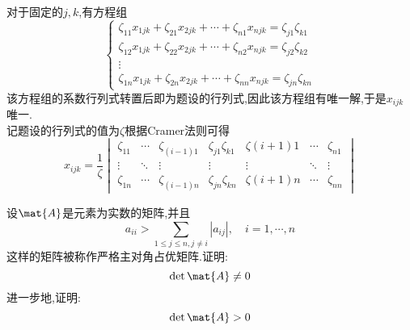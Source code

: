 \documentclass{ctexart}
\begin{document}
\begin{solution}
    对于固定的$j,k$,有方程组
    \[\left\{\begin{array}{c}
        \zeta_{11}x_{1jk}+\zeta_{21}x_{2jk}+\cdots+\zeta_{n1}x_{njk}=\zeta_{j1}\zeta_{k1}\\
        \zeta_{12}x_{1jk}+\zeta_{22}x_{2jk}+\cdots+\zeta_{n2}x_{njk}=\zeta_{j2}\zeta_{k2}\\
        \vdots\\
        \zeta_{1n}x_{1jk}+\zeta_{2n}x_{2jk}+\cdots+\zeta_{nn}x_{njk}=\zeta_{jn}\zeta_{kn}
    \end{array}\right.\]
    该方程组的系数行列式转置后即为题设的行列式,因此该方程组有唯一解,于是$x_{ijk}$唯一.\\
    记题设的行列式的值为$\zeta$根据Cramer法则可得
    \[x_{ijk}=\dfrac{1}{\zeta}\begin{vmatrix}
        \zeta_{11}&\cdots&\zeta_{(i-1)1}&\zeta_{j1}\zeta_{k1}&\zeta{(i+1)1}&\cdots&\zeta_{n1}\\
        \vdots&\ddots&\vdots&\vdots&\vdots&\ddots&\vdots\\
        \zeta_{1n}&\cdots&\zeta_{(i-1)n}&\zeta_{jn}\zeta_{kn}&\zeta{(i+1)n}&\cdots&\zeta_{nn}
    \end{vmatrix}\]
\end{solution}
\begin{problem}
    设$\mat{A}$是元素为实数的矩阵,并且
    \[a_{ii}>\sum_{1\leqslant j\leqslant n,j\neq i}\left|a_{ij}\right|,\quad i=1,\cdots,n\]
    这样的矩阵被称作严格主对角占优矩阵.证明:
    \[\det\mat{A}\neq0\]
    进一步地,证明:
    \[\det\mat{A}>0\]
\end{problem}
\end{document}
